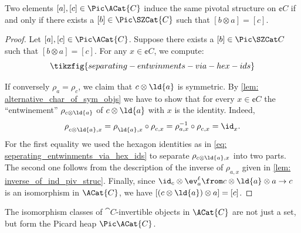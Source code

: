 \begin{proposition}\label{prop:induced-piv-structure-depends-only-on-orbit}
  Two elements \([a], [c] \in \Pic\ACat{C}\) induce the same pivotal structure on \(\cent{C}\)
  if and only if there exists a \([b] \in \Pic\SZCat{C}\) such that \([b \otimes a] = [c]\).
\end{proposition}
\begin{proof}
  Let \([a], [c] \in \Pic \ACat{C}\).
  Suppose there exists a \([b] \in \Pic \SZCat C\) such that \([b \otimes a] = [c]\).
  For any \(x\in \cent{C}\), we compute:
  \begin{equation}\label{eq: seperating_entwinments_via_hex_ids}
    \tikzfig{separating-entwinments-via-hex-ids}
  \end{equation}

  If conversely \(\rho_a = \rho_c\), we claim that \(c \otimes \ld{a}\) is symmetric.
  By \cref{lem: alternative_char_of_sym_objs}
  we have to show that for every \(x\in \cent{C}\) the ``entwinement'' \(\rho_{c \otimes \ld{a}}\) of \(c \otimes \ld{a}\) with \(x\) is the identity.
  Indeed,
  \[
    \rho_{c \otimes \ld{a}, x}^{\vphantom{-1}}
    = \rho_{\ld{a}, x}^{\vphantom{-1}} \circ \rho_{c, x}^{\vphantom{-1}}
    = \rho_{a, x}^{-1} \circ \rho_{c, x}^{\vphantom{-1}}
    = \id_x^{\vphantom{-1}}.
  \]
  For the first equality we used the hexagon identities as in \cref{eq: seperating_entwinments_via_hex_ids}
  to separate \(\rho_{c \otimes \ld{a}, x}\) into two parts.
  The second one follows from the description of the inverse of \(\rho_{a,x}\) given in \cref{lem: inverse_of_ind_piv_struc}.
  Finally, since \(\id_{c}\otimes \ev_{a}^{\ell} \from c \otimes \ld{a} \otimes a \to c\) is an isomorphism in \(\ACat{C}\),
  we have \([(c\otimes \ld{a}) \otimes a] = [c]\).
\end{proof}

The isomorphism classes of \(\cat{C}\)\hyp{}invertible objects in \(\ACat{C}\)
are not just a set, but form the Picard heap \(\Pic \ACat{C}\).

